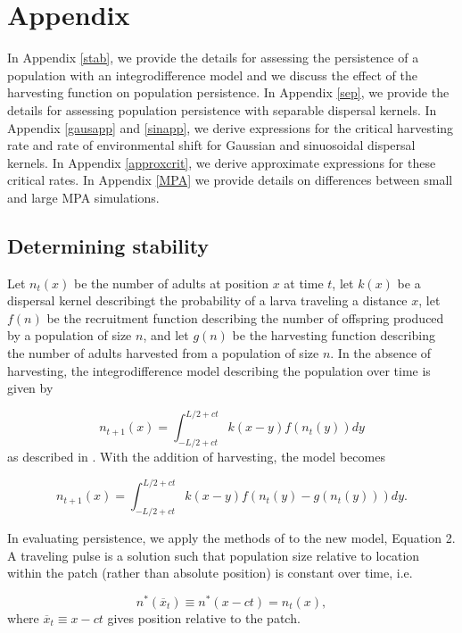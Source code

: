 \documentclass[12pt,english]{article}
\begin{document}
\appendix
\section{Appendix}
In Appendix \ref{stab}, we provide the details for assessing the persistence of a population with an integrodifference model and we discuss the effect of the harvesting function on population persistence.  In Appendix \ref{sep}, we provide the details for assessing population persistence with separable dispersal kernels.  In Appendix \ref{gausapp} and \ref{sinapp}, we derive expressions for the critical harvesting rate and rate of environmental shift for Gaussian and sinuosoidal dispersal kernels.  In Appendix \ref{approxcrit}, we derive approximate expressions for these critical rates. In Appendix \ref{MPA} we provide details on differences between small and large MPA simulations. 

\subsection{Determining stability \label{stab}}
Let $n_t(x)$ be the number of adults at position $x$ at time $t$, let $k(x)$ be a dispersal kernel describingt the probability of a larva traveling a distance $x$, let $f(n)$ be the recruitment function describing the number of offspring produced by a population of size $n$, and let $g(n)$ be the harvesting function describing the number of adults harvested from a population of size $n$.  In the absence of harvesting, the integrodifference model describing the population over time is given by 

\begin{equation} n_{t+1}(x)=\int_{-L/2+ct}^{L/2+ct}k(x-y)f(n_t(y))dy \label{integro} \end{equation}
as described in \citet{ZhouKot2011}.  With the addition of harvesting, the model becomes

\begin{equation} n_{t+1}(x)=\int_{-L/2+ct}^{L/2+ct}k(x-y)f(n_t(y)-g(n_t(y)))dy. \label{integro} \end{equation}

In evaluating persistence, we apply the methods of \citet{ZhouKot2011} to the new model, Equation 2.  A traveling pulse is a solution such that population size relative to location within the patch (rather than absolute position) is constant over time, i.e. 

\begin{equation*}
n^*(\overline{x}_t)\equiv n^*(x-ct)=n_t(x),   \label{trav} 
\end{equation*}
where $\overline{x}_t\equiv x-ct$ gives position relative to the patch. 
\end{document}
